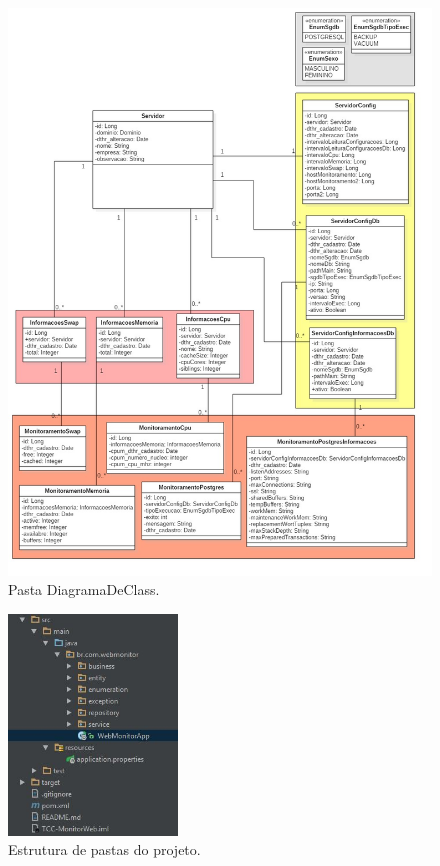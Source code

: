 \begin{figure}[H]
	\centering
	\includegraphics[width=1.0\textwidth]{figuras/DiagramaDeClassResumido.jpg}
	\caption[Pasta DiagramaDeClass.]{Pasta DiagramaDeClass.}
	\label{Img:estruturaDePastaPojetoEntity}
	
\end{figure}

\begin{figure}[H]
	\centering
	\includegraphics[width=0.4\textwidth]{figuras/estruturaPojeto.JPG}
	\caption[Estrutura de pastas do projeto.]{Estrutura de pastas do projeto.}
	\label{Img:estruturaDePastaPojeto}
	
\end{figure}
	
